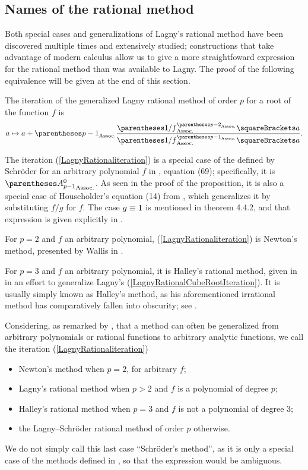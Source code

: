 ﻿\documentclass[10pt, a4paper, twoside]{basestyle}
\begin{document}
\subsection*{Names of the rational method}
Both special cases and generalizations of Lagny's rational method have been discovered multiple times
and extensively studied; constructions that take advantage of modern calculus allow us to give a more
straightfoward expression for the rational method than was available to Lagny.
The proof of the following equivalence will be given at the end of this section.
\begin{proposition}
The iteration of the generalized Lagny rational method of order $p$ for a root of the
function $f$ is\begin{equation}
a\mapsto a + \pa{p-1}\frac{\pa{1/f}^{\pa{p-2}}\of{a}}{\pa{1/f}^{\pa{p-1}}\of{a}}\text.\label{LagnyRationaliteration}
\end{equation}
\end{proposition}
The iteration (\ref{LagnyRationaliteration}) is a special case of the  defined by Schröder for an
arbitrary polynomial $f$ in \cite[349\psq]{Schröder1870}, equation (69); specifically, it is $\pa{A^0_{p-1}}$.
As seen in the proof of the proposition, it is also a special case of Householder’s  equation (14) from \cite[169]{Householder1970}, which generalizes it by substituting $f/g$ for $f$. The case
$g\equiv1$ is mentioned in theorem 4.4.2, and that expression is given explicitly in \cite{SebahGourdon2001}.

For $p=2$ and $f$ an arbitrary polynomial, (\ref{LagnyRationaliteration}) is Newton's method, presented by Wallis in
\cite[338]{Wallis1685}.

For $p=3$ and $f$ an arbitrary polynomial, it is Halley's rational method, given in \cite[142--143]{Halley1694} in
an effort to generalize Lagny's (\ref{LagnyRationalCubeRootIteration}).
It is usually simply known as Halley's method, as his aforementioned irrational method has comparatively fallen into obscurity; see \cite{ScavoThoo1995}.

Considering, as remarked by \cite[334]{Schröder1870}, that a method can often
be generalized from arbitrary polynomials or rational functions to arbitrary
analytic functions, we call the iteration (\ref{LagnyRationaliteration})\begin{itemize}[nosep]
\item Newton’s method when $p=2$, for arbitrary $f$;
\item Lagny’s rational method when $p>2$ and $f$ is a polynomial of degree $p$;
\item Halley’s rational method when $p=3$ and $f$ is not a polynomial of degree $3$;
\item the Lagny--Schröder rational method of order $p$ otherwise.
\end{itemize}
We do not simply call this last case ``Schröder’s method'', as it is only a special case of the methods
defined in \cite{Schröder1870}, so that the expression would be ambiguous. 
\end{document}
